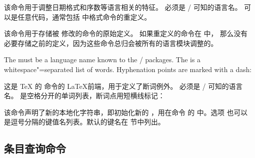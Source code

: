 \begin{ltxsyntax}
该命令用于调整日期格式和序数等语言相关的特征。
 必须是 / 可知的语言名。
 可以是任意代码，通常包括  中格式命令的重定义。



该命令用于存储被  修改的命令的原始定义。
如果重定义的命令在  中，
那么没有必要存储之前的定义，因为这些命令总归会被所有的语言模块调整的。


The  must be a language name known to the / packages. The  is a whitespace"=separated list of words. Hyphenation points are marked with a dash:

这是 \TeX{} 的  命令的 \LaTeX 前端，用于定义了断词例外。
 必须是 / 可知的语言名。
 是空格分开的单词列表，断词点用短横线标记：

\begin{ltxexample}
\end{ltxexample}


该命令声明了新的本地化字符串，即初始化新的 ，用在命令  的  中。选项  也可以是逗号分隔的键值名列表。默认的键名在  节中列出。
\end{ltxsyntax}

\subsection{条目查询命令}%
\label{use:eq}

